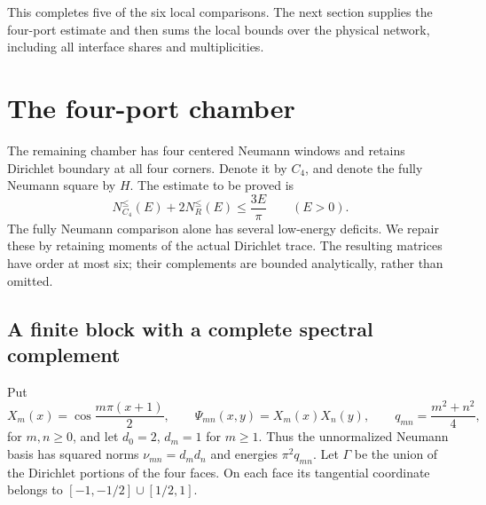 \documentclass[11pt,reqno]{amsart}
\numberwithin{equation}{section}
\begin{document}
This completes five of the six local comparisons. The next section
supplies the four-port estimate and then sums the local bounds over
the physical network, including all interface shares and multiplicities.

\section{The four-port chamber}
\label{sec:degree-four}

The remaining chamber has four centered Neumann windows and retains
Dirichlet boundary at all four corners. Denote it by $C_4$, and denote
the fully Neumann square by $H$. The estimate to be proved is
\begin{equation}
 N_{C_4}^{\le}(E)+2N_R^{\le}(E)\le\frac{3E}{\pi}
 \qquad(E>0).
 \label{df:local-result}
\end{equation}
The fully Neumann comparison alone has several low-energy deficits.
We repair these by retaining moments of the actual Dirichlet trace.
The resulting matrices have order at most six; their complements are
bounded analytically, rather than omitted.

\subsection{A finite block with a complete spectral complement}

Put
\[
 X_m(x)=\cos\frac{m\pi(x+1)}2,\qquad
 \Psi_{mn}(x,y)=X_m(x)X_n(y),\qquad
 q_{mn}=\frac{m^2+n^2}{4},
\]
for $m,n\ge0$, and let $d_0=2$, $d_m=1$ for $m\ge1$.
Thus the unnormalized Neumann basis has squared norms
$\nu_{mn}=d_md_n$ and energies $\pi^2q_{mn}$.
Let $\Gamma$ be the union of the Dirichlet portions of the four faces.
On each face its tangential coordinate belongs to
$[-1,-1/2]\cup[1/2,1]$.
\end{document}
